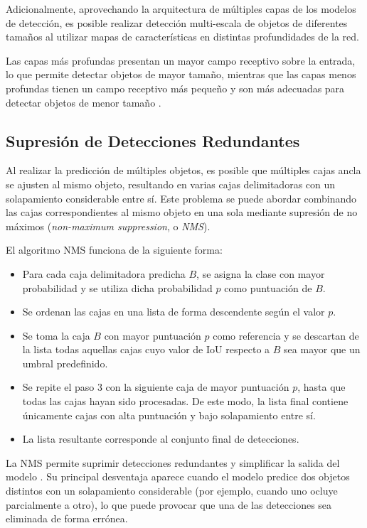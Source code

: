 Adicionalmente, aprovechando la arquitectura de múltiples capas de los modelos de detección,
es posible realizar detección multi-escala de objetos de diferentes tamaños al utilizar mapas 
de características en distintas profundidades de la red.
\medskip

Las capas más profundas presentan un mayor campo receptivo sobre la entrada, lo que permite 
detectar objetos de mayor tamaño, mientras que las capas menos profundas tienen un campo 
receptivo más pequeño y son más adecuadas para detectar objetos de menor tamaño \parencite[pp.~648--649]{zhang2023dive}.

\subsection{Supresión de Detecciones Redundantes}
Al realizar la predicción de múltiples objetos, es posible que múltiples cajas ancla se ajusten al mismo
objeto, resultando en varias cajas delimitadoras con un solapamiento considerable entre sí.
Este problema se puede abordar combinando las cajas correspondientes al mismo objeto en una sola mediante
supresión de no máximos (\textit{non-maximum suppression}, o \textit{NMS}).
\medskip

El algoritmo NMS funciona de la siguiente forma:
\begin{itemize}
    \item[1.] Para cada caja delimitadora predicha $B$, se asigna la clase con mayor probabilidad y
    se utiliza dicha probabilidad $p$ como puntuación de $B$.
    \item[2.] Se ordenan las cajas en una lista de forma descendente según el valor $p$.
    \item[3.] Se toma la caja $B$ con mayor puntuación $p$ como referencia y se descartan de la lista
    todas aquellas cajas cuyo valor de IoU respecto a $B$ sea mayor que un umbral predefinido.
    \item[4.] Se repite el paso 3 con la siguiente caja de mayor puntuación $p$, hasta que todas las cajas
    hayan sido procesadas. De este modo, la lista final contiene únicamente cajas con alta puntuación y bajo solapamiento entre sí.
    \item[5.] La lista resultante corresponde al conjunto final de detecciones.
\end{itemize}
La NMS permite suprimir detecciones redundantes y simplificar la salida del modelo \parencite{zhang2023dive}.
Su principal desventaja aparece cuando el modelo predice dos objetos distintos con un solapamiento considerable
(por ejemplo, cuando uno ocluye parcialmente a otro), lo que puede provocar que una de las detecciones sea
eliminada de forma errónea.


